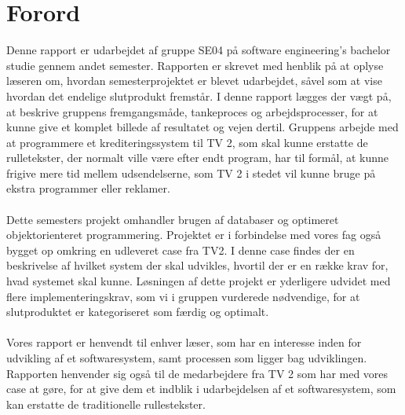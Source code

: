 
\clearpage
\section{Forord}
Denne rapport er udarbejdet af gruppe SE04 på software engineering's bachelor studie gennem andet semester. Rapporten er skrevet med henblik på at oplyse læseren om, hvordan semesterprojektet er blevet udarbejdet, såvel som at vise hvordan det endelige slutprodukt fremstår. I denne rapport lægges der vægt på, at beskrive gruppens fremgangsmåde, tankeproces og arbejdsprocesser, for at kunne give et komplet billede af resultatet og vejen dertil. Gruppens arbejde med at programmere et krediteringssystem til TV 2, som skal kunne erstatte de rulletekster, der normalt ville være efter endt program, har til formål, at kunne frigive mere tid mellem udsendelserne, som TV 2 i stedet vil kunne bruge på ekstra programmer eller reklamer.\\\\
Dette semesters projekt omhandler brugen af databaser og optimeret objektorienteret programmering. Projektet er i forbindelse med vores fag også bygget op omkring en udleveret case fra TV2. I denne case findes der en beskrivelse af hvilket system der skal udvikles, hvortil der er en række krav for, hvad systemet skal kunne. Løsningen af dette projekt er yderligere udvidet med flere implementeringskrav, som vi i gruppen vurderede nødvendige, for at slutproduktet er kategoriseret som færdig og optimalt.\\\\
Vores rapport er henvendt til enhver læser, som har en interesse inden for udvikling af et softwaresystem, samt processen som ligger bag udviklingen. Rapporten henvender sig også til de medarbejdere fra TV 2 som har med vores case at gøre, for at give dem et indblik i udarbejdelsen af et softwaresystem, som kan erstatte de traditionelle rullestekster.
